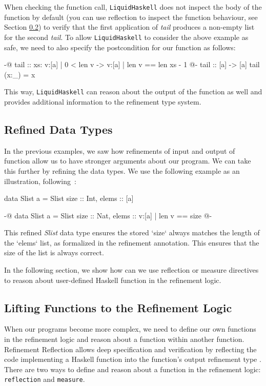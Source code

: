\documentclass[]{rptuseminar}
\begin{document}
When checking the function call, \texttt{LiquidHaskell} does not inspect the body of the function by default (you can use reflection to inspect the function behaviour, see Section \ref{sec:reflection}) to verify that the first application 
of \textit{tail} produces a non-empty list for the second \textit{tail}.
To allow \texttt{LiquidHaskell} to consider the above example as safe, we need to also specify the postcondition for our function as follows:

\begin{haskell}
 {-@ tail :: xs: {v:[a] | 0 < len v} -> {v:[a] | len v == len xs - 1} @-}
 tail :: [a] -> [a]
 tail (x:_) = x
\end{haskell}

This way, \texttt{LiquidHaskell} can reason about the output of the 
function as well and provides additional information to the refinement type system.


\subsection{Refined Data Types}
In the previous examples, we saw how refinements of input and output of function allow us to have stronger arguments about our program. 
We can take this further by refining the data types. 
We use the following example as an illustration, following~\cite{jhala_programming_2020}:
\begin{haskell}
  data Slist a = Slist { size :: Int, elems :: [a] }

  {-@ data Slist a = Slist { size :: Nat, elems :: {v:[a] | len v == size} } @-}
\end{haskell}

This refined \textit{Slist} data type ensures the stored `size` always matches the length of the `elems` list, 
as formalized in the refinement annotation. 
This ensures that the size of the list is always correct.

In the following section, we show how can we use reflection or measure directives to reason about user-defined Haskell function in the refinement logic.

\subsection{Lifting Functions to the Refinement Logic}
\label{sec:reflection}
When our programs become more complex, we need to define our own functions in the refinement logic and reason about
a function within another function. Refinement Reflection allows deep specification and verification by 
reflecting the code implementing a Haskell function into the function’s output refinement type \cite{niki_blog_2016}.
There are two ways to define and reason about a function in the refinement logic: \texttt{reflection} and \texttt{measure}. 
\end{document}
